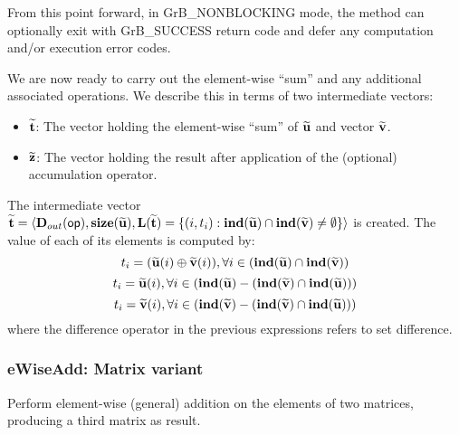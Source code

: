 From this point forward, in {\sf GrB\_NONBLOCKING} mode, the method can 
optionally exit with {\sf GrB\_SUCCESS} return code and defer any computation 
and/or execution error codes.

We are now ready to carry out the element-wise ``sum'' and any additional 
associated operations.  We describe this in terms of two intermediate vectors:
\begin{itemize}
    \item ${\bf \widetilde{t}}$: The vector holding the element-wise ``sum'' of
    ${\bf \widetilde{u}}$ and vector ${\bf \widetilde{v}}$.
    \item ${\bf \widetilde{z}}$: The vector holding the result after 
    application of the (optional) accumulation operator.
\end{itemize}

The intermediate vector ${\bf \widetilde{t}} = \langle
\mbox{$\mathbf{D}_{out}$}({\sf op}), \bold{size}({\bf \widetilde{u}}),
\bold{L}({\bf \widetilde{t}}) =
\{(i,t_i) : \bold{ind}({\bf \widetilde{u}}) \cap 
\bold{ind}({\bf \widetilde{v}})
 \neq \emptyset \} \rangle$
is created.  The value of each of its elements is computed by:
\[t_i = ({\bf \widetilde{u}}(i) \oplus {\bf \widetilde{v}}(i)), \forall i \in (\bold{ind}({\bf \widetilde{u}}) \cap \bold{ind}({\bf \widetilde{v}}))\]
\[t_i = {\bf \widetilde{u}}(i), \forall i \in (\bold{ind}({\bf \widetilde{u}}) - (\bold{ind}({\bf \widetilde{v}}) \cap \bold{ind}({\bf \widetilde{u}})))\]
\[t_i = {\bf \widetilde{v}}(i), \forall i \in (\bold{ind}({\bf \widetilde{v}}) - (\bold{ind}({\bf \widetilde{v}}) \cap \bold{ind}({\bf \widetilde{u}})))\]
where the difference operator in the previous expressions refers to set difference.







\subsubsection{{\sf eWiseAdd}: Matrix variant}

Perform element-wise (general) addition on the elements of two matrices,
producing a third matrix as result.

\paragraph{\syntax}

